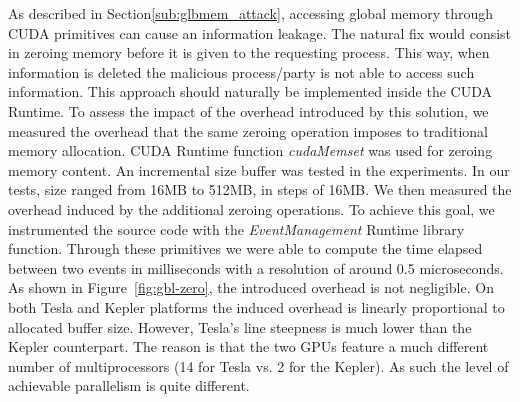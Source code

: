 \documentclass[11pt,onecolumn,letterpaper]{IEEEtran}
\begin{document}
As described in Section\ref{sub:glbmem_attack},
accessing global memory through CUDA primitives can cause an information leakage.
The natural fix would consist in zeroing memory before it is given to the requesting process.
This way, when information is deleted the malicious process/party is not able to access such information.
This approach should naturally be implemented inside the CUDA Runtime.
To assess 
the impact of the overhead introduced by this solution, we measured the overhead
that the same zeroing operation imposes to traditional memory allocation.
CUDA Runtime function \emph{cudaMemset} was used for zeroing memory content.
An incremental size buffer was tested in the experiments.
In our tests, size ranged from 16MB to 512MB, in steps of 16MB.
We then measured the overhead induced by the additional zeroing operations.
To achieve this goal, we instrumented the source code with the \emph{EventManagement} Runtime library function.
Through these primitives we were able to compute the time elapsed between two events in milliseconds
with a resolution of around 0.5 microseconds.\\
As shown in Figure~\ref{fig:gbl-zero}, the introduced overhead is not negligible.
On both Tesla and Kepler platforms the induced overhead is linearly proportional to allocated buffer size.
However, Tesla's line steepness is much lower than the Kepler counterpart.
The reason is that the two GPUs feature a much different number of multiprocessors
(14 for Tesla vs. 2 for the Kepler). As such the level of achievable parallelism is quite different.\\
\end{document}
